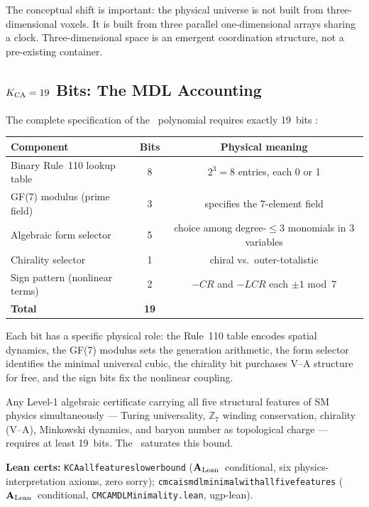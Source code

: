 \documentclass[11pt,openany]{book}
\theoremstyle{remark}
\newcommand{\lean}[1]{%
  \penalty-100
  \begingroup\def\_{\textunderscore\allowbreak}\texttt{#1}\endgroup}
\newcommand{\CMCA}{\text{CMCA}}
\newcommand{\CatAL}{\ensuremath{\textbf{A}_{\rm Lean}}}
\begin{document}
The conceptual shift is important: the physical universe is not built from
three-dimensional voxels.
It is built from three parallel one-dimensional arrays sharing a clock.
Three-dimensional space is an emergent coordination structure, not a pre-existing container.

\subsection*{$K_{\rm CA} = 19$ Bits: The MDL Accounting}

The complete specification of the \CMCA\ polynomial requires exactly 19~bits
\cite{SpivackCMCA,SpivackGTEPolynomialUFT}:

\begin{center}
\begin{tabular}{@{}P{5.5cm}cc@{}}
\toprule
\textbf{Component} & \textbf{Bits} & \textbf{Physical meaning} \\
\midrule
Binary Rule~110 lookup table & 8 & $2^3 = 8$ entries, each 0 or 1 \\
GF(7) modulus (prime field) & 3 & specifies the 7-element field \\
Algebraic form selector & 5 & choice among degree-$\leq 3$ monomials in 3 variables \\
Chirality selector & 1 & chiral vs.\ outer-totalistic \\
Sign pattern (nonlinear terms) & 2 & $-CR$ and $-LCR$ each $\pm 1$ mod~7 \\
\midrule
\textbf{Total} & \textbf{19} & \\
\bottomrule
\end{tabular}
\end{center}

\noindent
Each bit has a specific physical role: the Rule~110 table encodes spatial dynamics,
the GF(7) modulus sets the generation arithmetic, the form selector identifies the
minimal universal cubic, the chirality bit purchases V--A structure for free, and
the sign bits fix the nonlinear coupling.

\begin{tcolorbox}[colback=orange!5,colframe=orange!60,
  title={Result: $K_{\rm CA} = 19$ Bits is the MDL Minimum (\CatAL\ conditional)}]
Any Level-1 algebraic certificate carrying all five structural features of
SM physics simultaneously --- Turing universality, $\mathbb{Z}_7$ winding
conservation, chirality (V--A), Minkowski dynamics, and baryon number as topological
charge --- requires at least 19~bits.
The \CMCA\ saturates this bound.

\smallskip\noindent
\textbf{Lean certs:}
\lean{K\_CA\_all\_features\_lower\_bound} (\CatAL\ conditional, six physics-interpretation
axioms, zero sorry);
\lean{cmca\_is\_mdl\_minimal\_with\_all\_five\_features} (\CatAL\ conditional,
\texttt{CMCAMDLMinimality.lean}, ugp-lean).
\end{tcolorbox}
\end{document}
